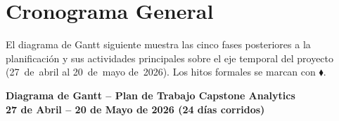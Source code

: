 \documentclass[12pt]{article}
\begin{document}
\section{Cronograma General}

El diagrama de Gantt siguiente muestra las cinco fases posteriores a la planificación y sus actividades principales sobre el eje temporal del proyecto (27~de~abril al 20~de~mayo de~2026). Los hitos formales se marcan con $\blacklozenge$.

\clearpage
\pdfpagewidth=297mm
\pdfpageheight=210mm
\thispagestyle{plain}

\begin{center}
{\large\bfseries\color{azulppal}%
Diagrama de Gantt -- Plan de Trabajo Capstone Analytics\\[0.15em]
{\normalsize\normalfont\color{grisoscuro}%
27 de Abril -- 20 de Mayo de 2026 \quad (24 d\'ias corridos)}}
\end{center}
\vspace{0.25cm}
\end{document}
